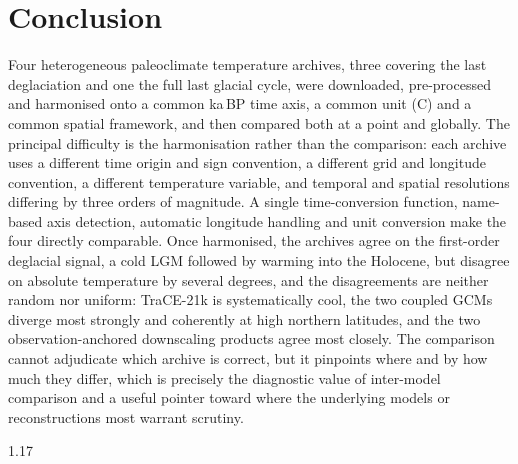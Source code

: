 \documentclass{isprs}
\newcommand{\degC}{\textdegree C}
\newcommand{\kaBP}{ka\,BP}
\begin{document}
\section{Conclusion}
Four heterogeneous paleoclimate temperature archives, three covering the last deglaciation and one the full last glacial cycle, were downloaded, pre-processed and harmonised onto a common \kaBP{} time axis, a common unit (\degC) and a common spatial framework, and then compared both at a point and globally. The principal difficulty is the harmonisation rather than the comparison: each archive uses a different time origin and sign convention, a different grid and longitude convention, a different temperature variable, and temporal and spatial resolutions differing by three orders of magnitude. A single time-conversion function, name-based axis detection, automatic longitude handling and unit conversion make the four directly comparable. Once harmonised, the archives agree on the first-order deglacial signal, a cold LGM followed by warming into the Holocene, but disagree on absolute temperature by several degrees, and the disagreements are neither random nor uniform: TraCE-21k is systematically cool, the two coupled GCMs diverge most strongly and coherently at high northern latitudes, and the two observation-anchored downscaling products agree most closely. The comparison cannot adjudicate which archive is correct, but it pinpoints where and by how much they differ, which is precisely the diagnostic value of inter-model comparison and a useful pointer toward where the underlying models or reconstructions most warrant scrutiny.

{
	\begin{spacing}{1.17}
		\normalsize
		
	\end{spacing}
}
\end{document}

